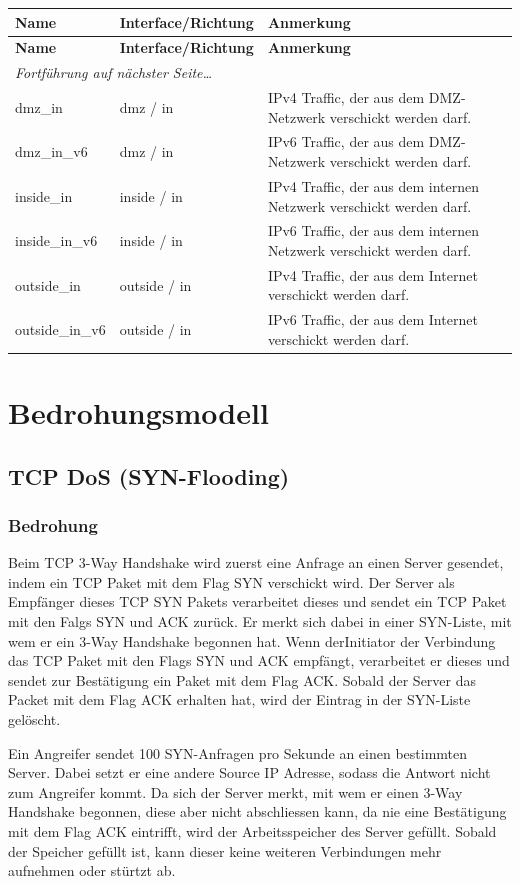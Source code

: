\documentclass[11pt,a4paper,parskip=half]{scrartcl}
\begin{document}
\begin{longtable}{p{2.5cm}|p{3.5cm}|p{7cm}}
	\textbf{Name} & \textbf{Interface/Richtung} & \textbf{Anmerkung}\\
	\hline
	\endfirsthead
	\textbf{Name} & \textbf{Interface/Richtung} & \textbf{Anmerkung}\\
	\hline
	\endhead
	\hline
	\multicolumn{2}{l}{\textit{Fortführung auf nächster Seite\ldots}} \\
	\endfoot
	\endlastfoot
	dmz\_in & dmz / in & IPv4 Traffic, der aus dem DMZ-Netzwerk verschickt werden darf.\\
	dmz\_in\_v6 & dmz / in & IPv6 Traffic, der aus dem DMZ-Netzwerk verschickt werden darf.\\
	inside\_in  & inside / in & IPv4 Traffic, der aus dem internen Netzwerk verschickt werden darf.\\
	inside\_in\_v6 & inside / in & IPv6 Traffic, der aus dem internen Netzwerk verschickt werden darf.\\
	outside\_in & outside / in & IPv4 Traffic, der aus dem Internet verschickt werden darf.\\
	outside\_in\_v6 & outside / in & IPv6 Traffic, der aus dem Internet verschickt werden darf.\\
\end{longtable}

\section{Bedrohungsmodell}
\subsection{TCP DoS (SYN-Flooding)}
\subsubsection{Bedrohung}
Beim TCP 3-Way Handshake wird zuerst eine Anfrage an einen Server gesendet, indem ein TCP Paket mit dem Flag SYN verschickt wird. Der Server als Empfänger dieses TCP SYN Pakets verarbeitet dieses und sendet ein TCP Paket mit den Falgs SYN und ACK zurück. Er merkt sich dabei in einer SYN-Liste, mit wem er ein 3-Way Handshake begonnen hat. Wenn derInitiator der Verbindung das TCP Paket mit den Flags SYN und ACK empfängt, verarbeitet er dieses und sendet zur Bestätigung ein Paket mit dem Flag ACK. Sobald der Server das Packet mit dem Flag ACK erhalten hat, wird der Eintrag in der SYN-Liste gelöscht.

Ein Angreifer sendet 100 SYN-Anfragen pro Sekunde an einen bestimmten Server. Dabei setzt er eine andere Source IP Adresse, sodass die Antwort nicht zum Angreifer kommt. Da sich der Server merkt, mit wem er einen 3-Way Handshake begonnen, diese aber nicht abschliessen kann, da nie eine Bestätigung mit dem Flag ACK eintrifft, wird der Arbeitsspeicher des Server gefüllt. Sobald der Speicher gefüllt ist, kann dieser keine weiteren Verbindungen mehr aufnehmen oder stürtzt ab.
\end{document}
